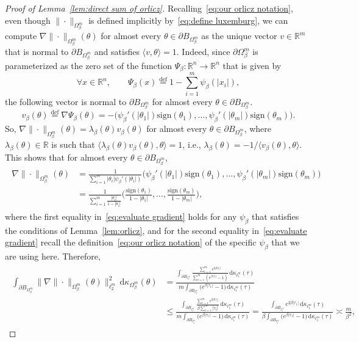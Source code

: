 \documentclass[11pt,reqno]{amsart}
\renewcommand{\le}{\leqslant}
\newcommand{\ud}[0]{\,\mathrm{d}}
\newcommand{\sign}{\mathrm{sign}}
\newcommand{\R}{\mathbb R}
\theoremstyle{remark}
\newcommand{\eqdef}{\stackrel{\mathrm{def}}{=}}
\renewcommand{\1}{\mathbf 1}
\begin{document}
\begin{proof}[Proof of Lemma~\ref{lem:direct sum of orlicz}]
Recalling~\eqref{eq:our orlicz notation}, even though  $\|\cdot\|_{\Omega_\beta^m}$ is defined implicitly by~\eqref{eq:define luxemburg}, we can compute $\nabla \|\cdot\|_{\Omega_\beta^m} (\theta)$ for almost every $\theta\in \partial B_{\Omega_\beta^m}$ as the unique vector $v\in \R^m$ that is normal to $\partial B_{\Omega_\beta^m}$ and satisfies $\langle v,\theta\rangle=1$. Indeed, since $\partial \Omega_\beta^m$ is parameterized as the zero set of the function $\Psi_{\!\!\beta}:\R^n\to \R^n$ that is given by
$$\forall x\in \R^n,\qquad \Psi_{\!\!\beta}(x)\eqdef 1-\sum_{i=1}^m \psi_{\!\!\beta}(|x_i|),
$$ the following vector is normal to $\partial B_{\Omega_\beta^m}$  for almost every $\theta\in \partial B_{\Omega_\beta^m}$.
$$v_\beta(\theta)\eqdef \nabla\Psi_{\!\!\beta}(\theta)=-\big(\psi_{\!\!\beta}'(|\theta_1|)\sign(\theta_1),\ldots,\psi_{\!\!\beta}'(|\theta_m|)\sign(\theta_m)\big).$$
  So, $\nabla \|\cdot\|_{\Omega_\beta^m} (\theta)=\lambda_\beta(\theta)v_\beta(\theta)$ for almost every $\theta\in \partial B_{\Omega_\beta^m}$, where $\lambda_\beta(\theta) \in \R$ is such that $\langle\lambda_\beta(\theta)v_\beta(\theta),\theta\rangle=1$, i.e., $\lambda_\beta(\theta)=-1/\langle v_\beta(\theta),\theta\rangle$. This shows that for almost every $\theta\in \partial B_{\Omega_\beta^m}$,
\begin{align}\label{eq:evaluate gradient}
\begin{split}
\nabla \|\cdot\|_{\Omega_\beta^m} (\theta)&=\frac{1}{\sum_{i=1}^m |\theta_i|\psi_{\!\!\beta}'(|\theta_i|)}\big(\psi_{\!\!\beta}'(|\theta_1|)\sign(\theta_1),\ldots,\psi_{\!\!\beta}'(|\theta_m|)\sign(\theta_m)\big)\\
&=\frac{1}{\sum_{i=1}^m \frac{|\theta_i|}{1-|\theta_i|}}\Big(\frac{\sign(\theta_1)}{1-|\theta_1|},\ldots,\frac{\sign(\theta_m)}{1-|\theta_m|}\Big),
\end{split}
\end{align}
where the first equality in~\eqref{eq:evaluate gradient} holds for any $\psi_{\!\!\beta}$ that satisfies the conditions of Lemma~\ref{lem:orlicz}, and   for the second equality in~\eqref{eq:evaluate gradient} recall the definition~\eqref{eq:our orlicz notation} of the specific  $\psi_{\!\!\beta}$ that we are using here. Therefore,
\begin{align}\label{eq:l2 norm of gradient orlicz}
\begin{split}
\int_{\partial B_{\Omega_\beta^m}}\big\|\nabla \|\cdot\|_{\Omega_\beta^m} (\theta)\big\|_{\ell_2^m}^2\ud\kappa_{\Omega_\beta^m}(\theta)&=\frac{\int_{\partial B_{\ell_1^m}} \frac{\sum_{i=1}^m e^{2\beta|\tau_i|}}{\sum_{i=1}^m (e^{\beta|\tau_i|}-1)}\ud \kappa_{\ell_1^m}(\tau)}{m\int_{\partial B_{\ell_1^m}}  \big(e^{\beta|\tau_1|}-1\big) \ud \kappa_{\ell_1^m}(\tau)}\\&\le \frac{\int_{\partial B_{\ell_1^m}} \frac{\sum_{i=1}^m e^{2\beta|\tau_i|}}{\beta \sum_{i=1}^m |\tau_i| }\ud \kappa_{\ell_1^m}(\tau)}{m\int_{\partial B_{\ell_1^m}}  \big(e^{\beta|\tau_1|}-1\big) \ud \kappa_{\ell_1^m}(\tau)}=\frac{\int_{\partial B_{\ell_1^m}} e^{2\beta|\tau_1|}\ud \kappa_{\ell_1^m}(\tau)}{\beta\int_{\partial B_{\ell_1^m}}  \big(e^{\beta|\tau_1|}-1\big) \ud \kappa_{\ell_1^m}(\tau)} \asymp \frac{m}{\beta^2},

\end{split}
\end{align}
\end{proof}
\end{document}
